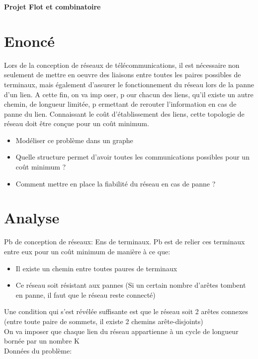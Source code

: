 \documentclass[frenchb]{article}
\begin{document}
		\begin{title}
			\textbf{\huge{Projet Flot et combinatoire}}
		\end{title}
		
		
		\section {	Enoncé}
			Lors de la conception de réseaux de télécommunications, il est nécessaire non seulement de mettre en oeuvre des liaisons entre toutes les paires possibles de terminaux, mais également d'assurer le fonctionnement du réseau lors de la panne d'un lien. A cette fin, on va imp oser, p our chacun des liens, qu'il existe un autre chemin, de longueur limitée, p ermettant de rerouter l'information en cas de panne du lien. Connaissant le coût d'établissement des liens, cette topologie de réseau doit être conçue pour un coût minimum.
			\begin{itemize}
				\item{Modéliser ce problème dans un graphe}
				\item{Quelle structure permet d'avoir toutes les communications possibles pour un coût minimum ?}
				\item{Comment mettre en place la fiabilité du réseau en cas de panne ?}
			\end{itemize}
			
			
			\section{Analyse}
				Pb de conception de réseaux:
				Ens de terminaux. Pb est de relier ces terminaux entre eux pour un coût minimum de manière à ce que:
				\begin{itemize}
					\item{Il existe un chemin entre toutes paures de terminaux}
					\item{Ce réseau soit résistant aux pannes (Si un certain nombre d'arêtes tombent en panne, il faut que le réseau reste connecté)} 
				\end{itemize}
				
				Une condition qui s'est révélée suffisante est que le réseau soit 2 arêtes connexes (entre toute paire de sommets, il existe 2 chemins arête-disjoints)\\
				
				On va imposer que chaque lien du réseau appartienne à un cycle de longueur bornée par un nombre K\\
				Données du problème:\\
				
\end{document}
